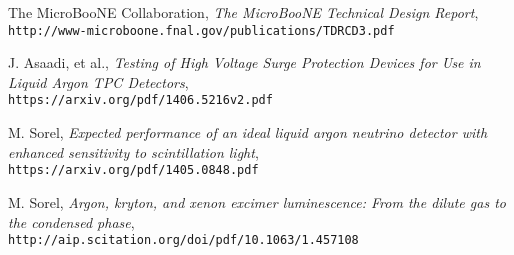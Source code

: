 \documentclass[12pt]{article}
\begin{document}
\begin{thebibliography}{20}
  The MicroBooNE Collaboration, \emph{The MicroBooNE Technical Design Report}, \\
  \texttt{http://www-microboone.fnal.gov/publications/TDRCD3.pdf}

  J. Asaadi, et al., \emph{Testing of High Voltage Surge Protection Devices for Use in Liquid Argon TPC Detectors}, \\
  \texttt{https://arxiv.org/pdf/1406.5216v2.pdf}

  M. Sorel, \emph{Expected performance of an ideal liquid argon neutrino detector with enhanced sensitivity to scintillation light}, \\
  \texttt{https://arxiv.org/pdf/1405.0848.pdf}

  M. Sorel, \emph{Argon, kryton, and xenon excimer luminescence: From the dilute gas to the condensed phase}, \\
  \texttt{http://aip.scitation.org/doi/pdf/10.1063/1.457108}

\end{thebibliography}
\end{document}
